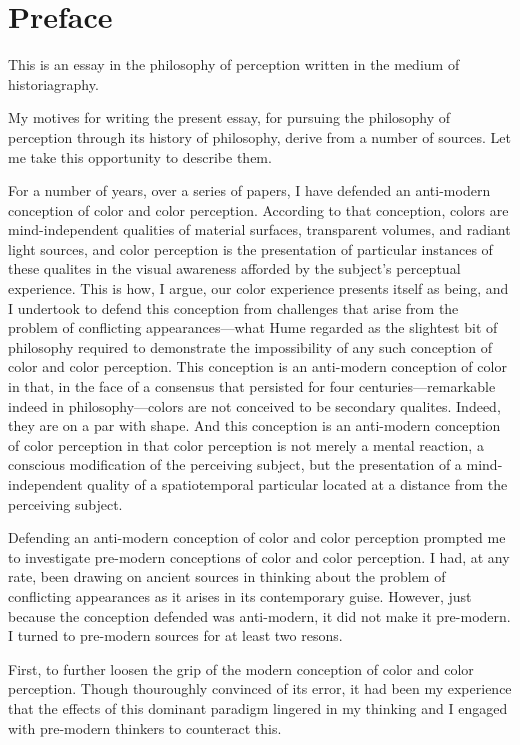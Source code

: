 \chapter*{Preface} %
\label{cha:preface}


This is an essay in the philosophy of perception written in the medium of historiagraphy. 

My motives for writing the present essay, for pursuing the philosophy of perception through its history of philosophy, derive from a number of sources. Let me take this opportunity to describe them.

For a number of years, over a series of papers, I have defended an anti-modern conception of color and color perception. According to that conception, colors are mind-independent qualities of material surfaces, transparent volumes, and radiant light sources, and color perception is the presentation of particular instances of these qualites in the visual awareness afforded by the subject's perceptual experience. This is how, I argue, our color experience presents itself as being, and I undertook to defend this conception from challenges that arise from the problem of conflicting appearances---what Hume regarded as the slightest bit of philosophy required to demonstrate the impossibility of any such conception of color and color perception. This conception is an anti-modern conception of color in that, in the face of a consensus that persisted for four centuries---remarkable indeed in philosophy---colors are not conceived to be secondary qualites. Indeed, they are on a par with shape. And this conception is an anti-modern conception of color perception in that color perception is not merely a mental reaction, a conscious modification of the perceiving subject, but the presentation of a mind-independent quality of a spatiotemporal particular located at a distance from the perceiving subject. 

Defending an anti-modern conception of color and color perception prompted me to investigate pre-modern conceptions of color and color perception. I had, at any rate, been drawing on ancient sources in thinking about the problem of conflicting appearances as it arises in its contemporary guise. However, just because the conception defended was anti-modern, it did not make it pre-modern. I turned to pre-modern sources for at least two resons. 

First, to further loosen the grip of the modern conception of color and color perception. Though thouroughly convinced of its error, it had been my experience that the effects of this dominant paradigm lingered in my thinking and I engaged with pre-modern thinkers to counteract this. 

